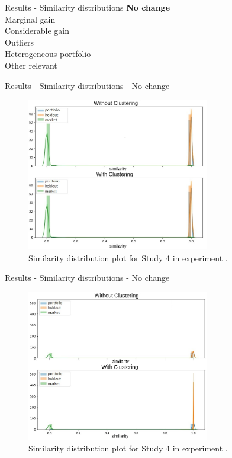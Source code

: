 \begin{frame}{Results - Similarity distributions} \pause
    \textbf<7->{No change} \\  \pause
    \vspace{0.5cm}
    Marginal gain \\ \pause
    \vspace{0.5cm}
    Considerable gain \\ \pause
    \vspace{0.5cm}
    Outliers \\ \pause
    \vspace{0.5cm}
    Heterogeneous portfolio \\ \pause
    \vspace{0.5cm}
    Other relevant 
\end{frame}


\begin{frame}{Results - Similarity distributions - No change}
    \begin{figure}
       \centering
       \includegraphics[width=8cm]{fig/ch4-study-4-comparsion-exp-i.png}
       \caption{Similarity distribution plot for Study 4 in experiment \nameExperimentI{}.}
    \end{figure}
\end{frame}


\begin{frame}{Results - Similarity distributions - No change}
    \begin{figure}
        \includegraphics[width=8cm]{fig/ch4-study-4-comparsion-exp-ii.png} 
        \caption{Similarity distribution plot for Study 4 in experiment \nameExperimentII{}.}
    \end{figure}
\end{frame}


